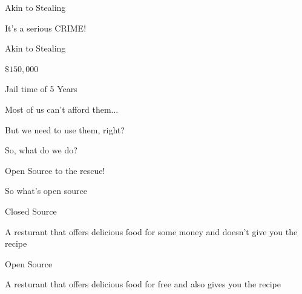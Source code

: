 \documentclass[10pt]{beamer}
\begin{document}
    \begin{frame}{Akin to Stealing}
        \centering
        \begin{LARGE}
            It's a serious CRIME!
        \end{LARGE}
    \end{frame}

    \begin{frame}{Akin to Stealing}
        \centering
        \begin{Huge}
            $\$150,000$
        \end{Huge}
        \vfill{}
        \begin{Huge}
            Jail time of 5 Years
        \end{Huge}
    \end{frame}

    \begin{frame}
        \centering
        \begin{Huge}
            Most of us can't afford them...
        \end{Huge}
    \end{frame}

    \begin{frame}
        \centering
        \begin{Huge}
            But we need to use them, right?
        \end{Huge}
    \end{frame}

    \begin{frame}
        \centering
        \begin{Huge}
            So, what do we do?
        \end{Huge}
    \end{frame}

    \begin{frame}
        \centering
        \begin{Huge}
            Open Source to the rescue!
        \end{Huge}
    \end{frame}

    \begin{frame}{So what's open source}
        \begin{Huge}
            Closed Source
        \end{Huge}

        A resturant that offers delicious food for some money and doesn't give you the recipe

        \vfill{}

        \begin{Huge}
            Open Source
        \end{Huge}

        A resturant that offers delicious food for free and also gives you the recipe
    \end{frame}
\end{document}

